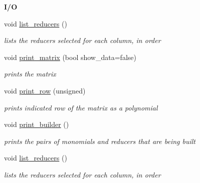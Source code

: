 \begin{Indent}\textbf{ I/O}\par
\begin{DoxyCompactItemize}
\item 
\mbox{\label{group___g_b_computation_af4491ffa78cb0e75051492b83f51744b}} 
void \hyperlink{group___g_b_computation_af4491ffa78cb0e75051492b83f51744b}{list\+\_\+reducers} ()
\begin{DoxyCompactList}\small\item\em lists the reducers selected for each column, in order \end{DoxyCompactList}\item 
void \hyperlink{group___g_b_computation_a9f3e9b5617084c34f97acd23d6e67a43}{print\+\_\+matrix} (bool show\+\_\+data=false)
\begin{DoxyCompactList}\small\item\em prints the matrix \end{DoxyCompactList}\item 
\mbox{\label{group___g_b_computation_a11e756a43276426735929d09976d7337}} 
void \hyperlink{group___g_b_computation_a11e756a43276426735929d09976d7337}{print\+\_\+row} (unsigned)
\begin{DoxyCompactList}\small\item\em prints indicated row of the matrix as a polynomial \end{DoxyCompactList}\item 
\mbox{\label{group___g_b_computation_a304778da38e44a01184b698b3de45df1}} 
void \hyperlink{group___g_b_computation_a304778da38e44a01184b698b3de45df1}{print\+\_\+builder} ()
\begin{DoxyCompactList}\small\item\em prints the pairs of monomials and reducers that are being built \end{DoxyCompactList}\item 
\mbox{\label{group___g_b_computation_af4491ffa78cb0e75051492b83f51744b}} 
void \hyperlink{group___g_b_computation_af4491ffa78cb0e75051492b83f51744b}{list\+\_\+reducers} ()
\begin{DoxyCompactList}\small\item\em lists the reducers selected for each column, in order \end{DoxyCompactList}\item 

\end{DoxyCompactItemize}
\end{Indent}
